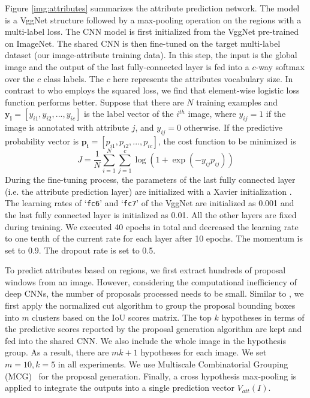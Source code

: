\documentclass[10pt,journal,compsoc]{IEEEtran}
\def\Att{{V_{att}}}
\begin{document}
Figure \ref{img:attributes} summarizes the attribute prediction network. The model is a VggNet structure followed by a max-pooling operation on the regions with a multi-label loss. The CNN model is first initialized from the VggNet pre-trained on ImageNet.
The shared CNN is then fine-tuned on the target multi-label dataset (our image-attribute training data). In this step, the input is the global image and the output of the last fully-connected layer is fed into a $c$-way softmax over the $c$ class labels. The $c$ here represents the attributes vocabulary size. In contrast to \cite{wei2014cnn} who employs the squared loss, we find that element-wise logistic loss function performs better. Suppose that there are $N$ training examples and $\bm{y_i}=[y_{i1}, y_{i2},... , y_{ic}]$ is the label vector of the $i^{th}$ image, where $y_{ij}=1$ if the image is annotated with attribute $j$, and $y_{ij}=0$ otherwise. If the predictive probability vector is $\bm{p_i}=[p_{i1}, p_{i2},... , p_{ic}]$, the cost function to be minimized is
\begin{equation}
 J=\frac{1}{N}\sum_{i=1}^{N}\sum_{j=1}^{c}\log(1+\exp(-y_{ij}p_{ij}))
\end{equation}
During the fine-tuning process, the parameters of the last fully connected layer (i.e. the attribute prediction layer) are initialized with a Xavier initialization \cite{glorot2010understanding}. The learning rates of  `\texttt{fc6}' and `\texttt{fc7}' of the VggNet are initialized as 0.001 and the last fully connected layer is initialized as 0.01. All the other layers are fixed during training. We executed 40 epochs in total and decreased the learning rate to one tenth of the current rate for each layer after 10 epochs. The momentum is set to 0.9. The dropout rate is set to 0.5.

To predict attributes based on regions, we first extract hundreds of proposal windows from an image. However, considering the computational inefficiency of deep CNNs, the number of proposals processed needs to be small. Similar to \cite{wei2014cnn}, we first apply the normalized cut algorithm to group the proposal bounding boxes into $m$ clusters based on the IoU scores matrix. The top $k$ hypotheses in terms of the predictive scores reported by the proposal generation algorithm are kept and fed into the shared CNN. We also include the whole image in the hypothesis group. As a result, there are $mk+1$ hypotheses for each image. We set $m=10, k=5$ in all experiments. We use Multiscale Combinatorial Grouping (MCG)~\cite{PABMM2015} for the proposal generation. Finally, a cross hypothesis max-pooling is applied to integrate the outputs into a single prediction vector $\Att(I)$.
\end{document}
